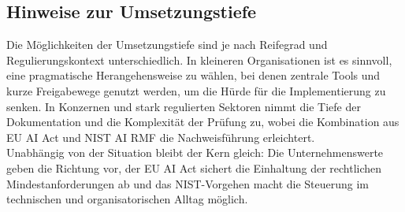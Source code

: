 \subsection{Hinweise zur Umsetzungstiefe}
Die Möglichkeiten der Umsetzungstiefe sind je nach Reifegrad und Regulierungskontext unterschiedlich.
In kleineren Organisationen ist es sinnvoll, eine pragmatische Herangehensweise zu wählen, bei denen zentrale Tools und kurze Freigabewege genutzt werden, um die Hürde für die Implementierung zu senken.
In Konzernen und stark regulierten Sektoren nimmt die Tiefe der Dokumentation und die Komplexität der Prüfung zu, wobei die Kombination aus EU AI Act und NIST AI RMF die Nachweisführung erleichtert.
\\
Unabhängig von der Situation bleibt der Kern gleich: Die Unternehmenswerte geben die Richtung vor, der EU AI Act sichert die Einhaltung der rechtlichen Mindestanforderungen ab und das NIST-Vorgehen macht die Steuerung im technischen und organisatorischen Alltag möglich.
